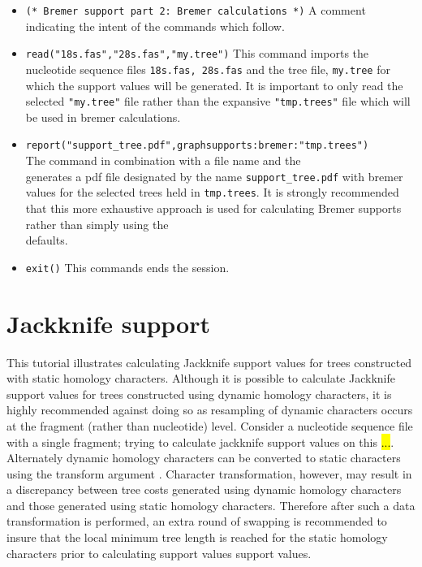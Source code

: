 \begin{itemize}
\item \texttt{(* Bremer support part 2: Bremer calculations *)}  A comment indicating the intent of the commands 
which follow.
\item \texttt{read("18s.fas","28s.fas","my.tree")} This command imports the nucleotide sequence files 
\texttt{18s.fas, 28s.fas} and the tree file, \texttt{my.tree} for which the support values will be generated.  It is 
important to only read the selected \texttt{"my.tree"} file rather than the expansive  \texttt{"tmp.trees"} file which 
will be used in bremer calculations.
\item \texttt{report("support\_tree.pdf",graphsupports:bremer:"tmp.trees")} \\The {} command 
in combination with a file name and the \\  generates a pdf file designated by the 
name \texttt{support\_tree.pdf} with bremer values for the selected trees held in \texttt{tmp.trees}.  It is strongly 
recommended that this more exhaustive approach is used for calculating Bremer supports rather than simply 
using the \\  defaults.  
\item \texttt{exit()} This commands ends the \poy session.
\end{itemize}


\section{Jackknife support}{\label{tutorial5}}

This tutorial illustrates calculating Jackknife support values for trees constructed with static homology characters.  
Although it is possible to calculate Jackknife support values 
for trees constructed using dynamic homology characters, it is highly recommended against doing so as resampling of 
dynamic characters occurs at the fragment (rather than nucleotide) level. Consider a nucleotide sequence file with a 
single fragment; trying to calculate jackknife support values on this \hl{...}.  Alternately dynamic homology 
characters can be converted to static characters using the transform argument .  
Character transformation, however, may result in a discrepancy between tree costs generated using dynamic 
homology characters and those generated using static homology characters. Therefore after such a data 
transformation is performed, an extra round of swapping is recommended to insure that the local minimum tree 
length is reached for the static homology characters prior to calculating support values  support values.

